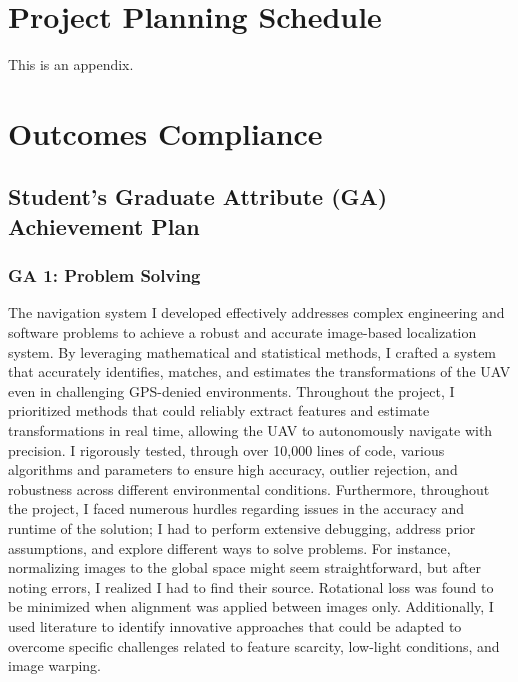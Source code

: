 \chapter{Project Planning Schedule}
\makeatletter{}\makeatother
\label{appen:derivations_bigramseg}

This is an appendix.

\chapter{Outcomes Compliance}
\makeatletter{}\makeatother
\label{appen:derivations_bigramseg}


\section*{Student’s Graduate Attribute (GA) Achievement Plan}

\subsection*{GA 1: Problem Solving}
The navigation system I developed effectively addresses complex engineering and software problems to achieve a robust and accurate image-based localization system. By leveraging mathematical and statistical methods, I crafted a system that accurately identifies, matches, and estimates the transformations of the UAV even in challenging GPS-denied environments. Throughout the project, I prioritized methods that could reliably extract features and estimate transformations in real time, allowing the UAV to autonomously navigate with precision. I rigorously tested, through over 10,000 lines of code, various algorithms and parameters to ensure high accuracy, outlier rejection, and robustness across different environmental conditions. Furthermore, throughout the project, I faced numerous hurdles regarding issues in the accuracy and runtime of the solution; I had to perform extensive debugging, address prior assumptions, and explore different ways to solve problems. For instance, normalizing images to the global space might seem straightforward, but after noting errors, I realized I had to find their source. Rotational loss was found to be minimized when alignment was applied between images only. Additionally, I used literature to identify innovative approaches that could be adapted to overcome specific challenges related to feature scarcity, low-light conditions, and image warping.

